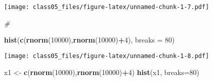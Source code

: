 \documentclass[]{article}
\newenvironment{Shaded}{\begin{snugshade}}{\end{snugshade}}
\newcommand{\KeywordTok}[1]{\textcolor[rgb]{0.13,0.29,0.53}{\textbf{#1}}}
\newcommand{\DataTypeTok}[1]{\textcolor[rgb]{0.13,0.29,0.53}{#1}}
\newcommand{\DecValTok}[1]{\textcolor[rgb]{0.00,0.00,0.81}{#1}}
\newcommand{\FloatTok}[1]{\textcolor[rgb]{0.00,0.00,0.81}{#1}}
\newcommand{\CharTok}[1]{\textcolor[rgb]{0.31,0.60,0.02}{#1}}
\newcommand{\StringTok}[1]{\textcolor[rgb]{0.31,0.60,0.02}{#1}}
\newcommand{\CommentTok}[1]{\textcolor[rgb]{0.56,0.35,0.01}{\textit{#1}}}
\newcommand{\OtherTok}[1]{\textcolor[rgb]{0.56,0.35,0.01}{#1}}
\newcommand{\OperatorTok}[1]{\textcolor[rgb]{0.81,0.36,0.00}{\textbf{#1}}}
\newcommand{\NormalTok}[1]{#1}
\begin{document}
\begin{Shaded}
\end{Shaded}

\texttt{[image: class05\_files/figure-latex/unnamed-chunk-1-7.pdf]}

\begin{Shaded}
\begin{Highlighting}[]
\CommentTok{#}

\KeywordTok{hist}\NormalTok{(}\KeywordTok{c}\NormalTok{(}\KeywordTok{rnorm}\NormalTok{(}\DecValTok{10000}\NormalTok{),}\KeywordTok{rnorm}\NormalTok{(}\DecValTok{10000}\NormalTok{)}\OperatorTok{+}\DecValTok{4}\NormalTok{), }\DataTypeTok{breaks =} \DecValTok{80}\NormalTok{)}
\end{Highlighting}
\end{Shaded}

\texttt{[image: class05\_files/figure-latex/unnamed-chunk-1-8.pdf]}

\begin{Shaded}
\begin{Highlighting}[]
\NormalTok{x1 <-}\StringTok{ }\KeywordTok{c}\NormalTok{(}\KeywordTok{rnorm}\NormalTok{(}\DecValTok{10000}\NormalTok{),}\KeywordTok{rnorm}\NormalTok{(}\DecValTok{10000}\NormalTok{)}\OperatorTok{+}\DecValTok{4}\NormalTok{)}
\KeywordTok{hist}\NormalTok{(x1, }\DataTypeTok{breaks=}\DecValTok{80}\NormalTok{)}
\end{Highlighting}
\end{Shaded}
\end{document}
